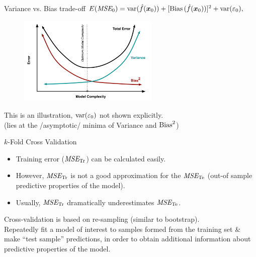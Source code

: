 \documentclass{beamer}
\begin{document}
\begin{frame}{Variance vs. Bias trade-off}
$E(\textit{MSE}_0)
   = \textnormal{var}(\hat{f}(\bm{x}_0))
   + [\textnormal{Bias\,}(\hat{f}(\bm{x}_0))]^2
   + \textnormal{var}(\varepsilon_0),$\\

\begin{figure}
\centering
\includegraphics[trim = 0cm 0cm 0cm 0cm, clip,width=0.6\textwidth]{img/biasvariance.png}
\end{figure}

\small{This is an illustration, $\textnormal{var}(\varepsilon_0)$ not shown explicitly. \\(lies at the /asymptotic/ minima of Variance and $\textnormal{Bias}^2$)}
\end{frame}
\begin{frame}{$k$-Fold Cross Validation}
\begin{itemize}
\item Training error ($\textit{MSE}_{\textnormal{Tr}}$) can be calculated easily. 
\item However, $\textit{MSE}_{\textnormal{Tr}}$ is not a good approximation for the $\textit{MSE}_{\textnormal{Te}}$ (out-of sample predictive properties of the model).
\item Usually, $\textit{MSE}_{\textnormal{Tr}}$ dramatically underestimates $\textit{MSE}_{\textnormal{Te}}$.
\end{itemize}
\bigskip
Cross-validation is based on re-sampling (similar to bootstrap).\\
\medskip
Repeatedly fit a model of interest to samples formed from the training set \& make ``test sample'' predictions, in order to obtain additional information about predictive properties of the model.\\
\end{frame}
\end{document}
